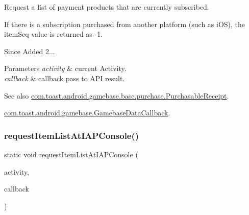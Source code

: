 Request a list of payment products that are currently subscribed. 

If there is a subscription purchased from another platform (such as i\+OS), the item\+Seq value is returned as -\/1.

\begin{DoxySince}{Since}
Added 2... 
\end{DoxySince}

\begin{DoxyParams}{Parameters}
{\em activity} & current Activity. \\
\hline
{\em callback} & callback pass to A\+PI result. \\
\hline
\end{DoxyParams}
\begin{DoxySeeAlso}{See also}
\hyperlink{classcom_1_1toast_1_1android_1_1gamebase_1_1base_1_1purchase_1_1_purchasable_receipt}{com.\+toast.\+android.\+gamebase.\+base.\+purchase.\+Purchasable\+Receipt}. 

\hyperlink{interfacecom_1_1toast_1_1android_1_1gamebase_1_1_gamebase_data_callback}{com.\+toast.\+android.\+gamebase.\+Gamebase\+Data\+Callback}. 
\end{DoxySeeAlso}
\mbox{\label{classcom_1_1toast_1_1android_1_1gamebase_1_1_gamebase_1_1_purchase_a541b8b3f42c728a330ed1d4b6e3bc9af}} 
\subsubsection{\texorpdfstring{request\+Item\+List\+At\+I\+A\+P\+Console()}{requestItemListAtIAPConsole()}}
{\footnotesize\ttfamily static void request\+Item\+List\+At\+I\+A\+P\+Console (\begin{DoxyParamCaption}\item[{@Non\+Null final Activity}]{activity,  }\item[{@Non\+Null final \hyperlink{interfacecom_1_1toast_1_1android_1_1gamebase_1_1_gamebase_data_callback}{Gamebase\+Data\+Callback}$<$ List$<$ \hyperlink{classcom_1_1toast_1_1android_1_1gamebase_1_1base_1_1purchase_1_1_purchasable_item}{Purchasable\+Item} $>$$>$}]{callback }\end{DoxyParamCaption})\hspace{0.3cm}{\ttfamily [static]}}




